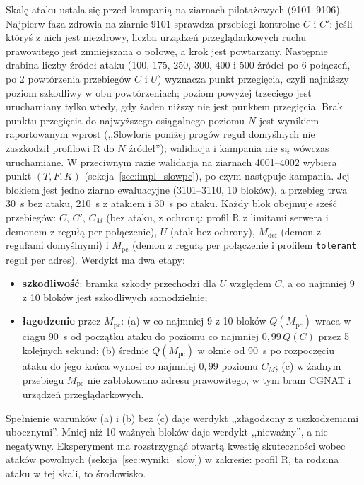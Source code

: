 \documentclass[a4paper,12pt]{article}
\begin{document}
Skalę ataku ustala się przed kampanią na ziarnach pilotażowych (9101--9106). Najpierw faza zdrowia na ziarnie 9101 sprawdza przebiegi kontrolne $C$ i $C'$: jeśli któryś z nich jest niezdrowy, liczba urządzeń przeglądarkowych ruchu prawowitego jest zmniejszana o połowę, a krok jest powtarzany. Następnie drabina liczby źródeł ataku (100, 175, 250, 300, 400 i 500 źródeł po 6 połączeń, po 2 powtórzenia przebiegów $C$ i $U$) wyznacza punkt przegięcia, czyli najniższy poziom szkodliwy w obu powtórzeniach; poziom powyżej trzeciego jest uruchamiany tylko wtedy, gdy żaden niższy nie jest punktem przegięcia. Brak punktu przegięcia do najwyższego osiągalnego poziomu $N$ jest wynikiem raportowanym wprost (,,Slowloris poniżej progów reguł domyślnych nie zaszkodził profilowi R do $N$ źródeł''); walidacja i kampania nie są wówczas uruchamiane. W przeciwnym razie walidacja na ziarnach 4001--4002 wybiera punkt $(T, F, K)$ (sekcja~\ref{sec:impl_slowpc}), po czym następuje kampania. Jej blokiem jest jedno ziarno ewaluacyjne (3101--3110, 10 bloków), a przebieg trwa 30~s bez ataku, 210~s z atakiem i 30~s po ataku. Każdy blok obejmuje sześć przebiegów: $C$, $C'$, $C_M$ (bez ataku, z ochroną: profil R z limitami serwera i demonem z regułą per połączenie), $U$ (atak bez ochrony), $M_{\mathrm{def}}$ (demon z regułami domyślnymi) i $M_{\mathrm{pc}}$ (demon z regułą per połączenie i profilem \texttt{tolerant} reguł per adres). Werdykt ma dwa etapy:
\begin{itemize}
    \item \textbf{szkodliwość}: bramka szkody przechodzi dla $U$ względem $C$, a co najmniej 9 z 10 bloków jest szkodliwych samodzielnie;
    \item \textbf{łagodzenie} przez $M_{\mathrm{pc}}$: (a) w co najmniej 9 z 10 bloków $Q(M_{\mathrm{pc}})$ wraca w ciągu 90~s od początku ataku do poziomu co najmniej $0{,}99\,Q(C)$ przez 5 kolejnych sekund; (b) średnie $Q(M_{\mathrm{pc}})$ w oknie od 90~s po rozpoczęciu ataku do jego końca wynosi co najmniej $0{,}99$ poziomu $C_M$; (c) w żadnym przebiegu $M_{\mathrm{pc}}$ nie zablokowano adresu prawowitego, w tym bram CGNAT i urządzeń przeglądarkowych.
\end{itemize}
Spełnienie warunków (a) i (b) bez (c) daje werdykt ,,złagodzony z uszkodzeniami ubocznymi''. Mniej niż 10 ważnych bloków daje werdykt ,,nieważny'', a nie negatywny. Eksperyment ma rozstrzygnąć otwartą kwestię skuteczności wobec ataków powolnych (sekcja~\ref{sec:wyniki_slow}) w zakresie: profil R, ta rodzina ataku w tej skali, to środowisko.
\end{document}
